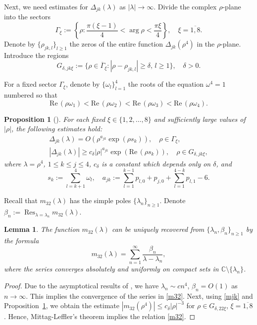 \documentclass[a4paper,12pt]{article}
\newcommand{\be}{\beta}
\newcommand{\de}{\delta}
\newcommand{\la}{\lambda}
\newcommand{\om}{\omega}
\theoremstyle{plain}
\numberwithin{equation}{section}
\newtheorem{lem}[thm]{Lemma}
\newtheorem{prop}[thm]{Proposition}
\theoremstyle{definition}
\theoremstyle{remark}
\DeclareMathOperator*{\Res}{Res}
\begin{document}
Next, we need estimates for $\Delta_{jk}(\la)$ as $|\la| \to \infty$. Divide the complex $\rho$-plane into the sectors
\begin{equation} \label{defGa}
\Gamma_{\xi} := \left\{ \rho \colon \frac{\pi(\xi-1)}{4} < \arg \rho < \frac{\pi \xi}{4}\right\}, \quad \xi = \overline{1,8}.
\end{equation}
Denote by $\{ \rho_{jk, l} \}_{l \ge 1}$ the zeros of the entire function $\Delta_{jk}(\rho^4)$ in the $\rho$-plane.
Introduce the regions
$$
G_{\de, jk\xi} := \{ \rho \in \overline{\Gamma}_{\xi} \colon |\rho - \rho_{jk,l}| \ge \de, \, l \ge 1 \}, \quad \de > 0.
$$

For a fixed sector $\Gamma_{\xi}$, denote by $\{ \om_l \}_{l = 1}^4$ the roots of the equation $\om^4 = 1$ numbered so that
$$
\mbox{Re} \, (\rho \om_1) < \mbox{Re} \, (\rho \om_2) < \mbox{Re} \, (\rho \om_3) < \mbox{Re} \, (\rho \om_4).
$$

\begin{prop}[\cite{Bond21, Bond22-asympt}] \label{prop:estD}
For each fixed $\xi \in \{ 1, 2, \dots, 8 \}$ and sufficiently large values of $|\rho|$, the following estimates hold:
\begin{align*}
\Delta_{jk}(\la) = O\left( \rho^{a_{jk}} \exp(\rho s_k)\right), \quad \rho \in \Gamma_{\xi}, \\
|\Delta_{jk}(\la)| \ge c_{\de} |\rho|^{a_{jk}} \exp(\mbox{Re}\, (\rho s_k)), \quad \rho \in G_{\de, jk \xi},
\end{align*}
where $\la = \rho^4$, $1 \le k \le j \le 4$, $c_{\de}$ is a constant which depends only on $\de$, and
$$
s_k := \sum\limits_{l = k+1}^4 \om_l, \quad a_{jk} := \sum_{l = 1}^{k-1} p_{l,0} + p_{j,0} + \sum_{l = 1}^{4-k} p_{l,1} - 6.
$$
\end{prop}


Recall that $m_{32}(\la)$ has the simple poles $\{ \la_n \}_{n \ge 1}$. Denote $\be_n := \Res_{\la = \la_n} m_{32}(\la)$. 

\begin{lem} \label{lem:m32}
The function $m_{32}(\la)$ can be uniquely recovered from $\{ \la_n, \be_n\}_{n \ge 1}$ by the formula
\begin{equation} \label{m32}
m_{32}(\la) = \sum_{n = 1}^{\infty} \frac{\be_n}{\la - \la_n},
\end{equation}
where the series converges absolutely and uniformly on compact sets in $\mathbb C \setminus \{ \la_n \}$.
\end{lem}

\begin{proof}
Due to the asymptotical results of \cite{Bond22-asympt, Bond22-alg}, we have $\la_n \sim c n^4$, $\be_n = O(1)$ as $n \to \infty$. This implies the convergence of the series in \eqref{m32}. Next, using \eqref{mjk} and Proposition~\ref{prop:estD}, we obtain the estimate $|m_{32}(\rho^4)| \le c_{\de} |\rho|^{-3}$ for $\rho \in G_{\de,22\xi}$, $\xi = \overline{1,8}$. Hence, Mittag-Leffler's theorem implies the relation \eqref{m32}.
\end{proof}
\end{document}
